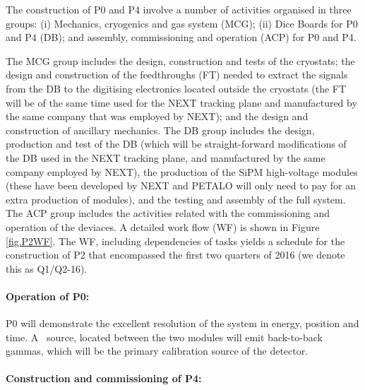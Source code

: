 The construction of P0 and P4 involve a number of activities  organised in three groups: (i) Mechanics, cryogenics and gas system (MCG);  (ii) Dice Boards for P0 and P4 (DB);  and assembly, commissioning and operation (ACP) for P0 and P4. 

The MCG group includes the design, construction and tests of the cryostats; the design and construction of the feedthroughs (FT) needed to extract the signals from the DB to the digitising electronics located outside the cryostats (the FT will be of the same time used for the NEXT tracking plane and manufactured by the same company that was employed by NEXT);  and the design and construction of ancillary mechanics. The DB group includes the design, production and test of the DB (which will be straight-forward modifications of the DB used in the NEXT tracking plane, and manufactured by the same company employed by NEXT), the production of the SiPM high-voltage modules (these have been developed by NEXT and PETALO will only need to pay for an extra production of modules), and the testing and assembly of the full system. The ACP group includes the activities related with the commissioning and operation of the deviaces. A detailed work flow (WF) is shown in Figure \ref{fig.P2WF}. The WF, including dependencies of tasks yields a schedule for the construction of P2 that encompassed the first two quarters of 2016 (we denote this as Q1/Q2-16). 

\paragraph{Operation of P0:}


P0 will demonstrate the excellent resolution of the system in energy, position and time. A \NA\ source, located between the two modules will emit back-to-back gammas, which will be the primary calibration source of the detector. 

\paragraph{Construction and commissioning of P4:}
%

